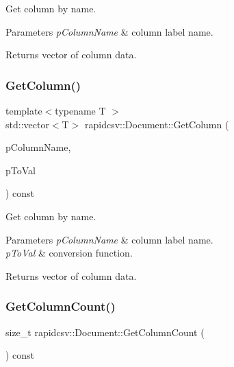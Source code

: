 Get column by name. 


\begin{DoxyParams}{Parameters}
{\em p\+Column\+Name} & column label name. \\
\hline
\end{DoxyParams}
\begin{DoxyReturn}{Returns}
vector of column data. 
\end{DoxyReturn}
\mbox{\label{classrapidcsv_1_1Document_ad92a31a92917afab0c35bc577a903b89}} 
\subsubsection{\texorpdfstring{Get\+Column()}{GetColumn()}\hspace{0.1cm}{\footnotesize\ttfamily [4/4]}}
{\footnotesize\ttfamily template$<$typename T $>$ \\
std\+::vector$<$T$>$ rapidcsv\+::\+Document\+::\+Get\+Column (\begin{DoxyParamCaption}\item[{const std\+::string \&}]{p\+Column\+Name,  }\item[{Conv\+Func$<$ T $>$}]{p\+To\+Val }\end{DoxyParamCaption}) const\hspace{0.3cm}{\ttfamily [inline]}}



Get column by name. 


\begin{DoxyParams}{Parameters}
{\em p\+Column\+Name} & column label name. \\
\hline
{\em p\+To\+Val} & conversion function. \\
\hline
\end{DoxyParams}
\begin{DoxyReturn}{Returns}
vector of column data. 
\end{DoxyReturn}
\mbox{\label{classrapidcsv_1_1Document_ae56d9b1d6b3b0037371032ba0dc0ee5c}} 
\subsubsection{\texorpdfstring{Get\+Column\+Count()}{GetColumnCount()}}
{\footnotesize\ttfamily size\+\_\+t rapidcsv\+::\+Document\+::\+Get\+Column\+Count (\begin{DoxyParamCaption}{ }\end{DoxyParamCaption}) const\hspace{0.3cm}{\ttfamily [inline]}}



